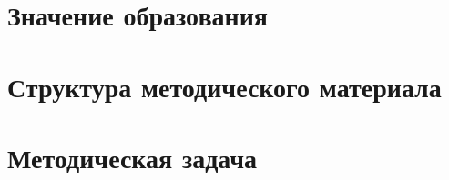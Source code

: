 \label{pedagogic_chapter}


\section{Значение образования}



\section{Структура методического материала}



\section{Методическая задача}





